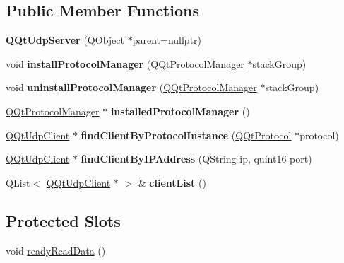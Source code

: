 \subsection*{Public Member Functions}
\begin{DoxyCompactItemize}
\item 
\mbox{\label{class_q_qt_udp_server_a1e105204fe08762d63e36cd4fb41152f}} 
{\bfseries Q\+Qt\+Udp\+Server} (Q\+Object $\ast$parent=nullptr)
\item 
\mbox{\label{class_q_qt_udp_server_aaa8d7be82c3891536fb8c468333db819}} 
void {\bfseries install\+Protocol\+Manager} (\mbox{\hyperlink{class_q_qt_protocol_manager}{Q\+Qt\+Protocol\+Manager}} $\ast$stack\+Group)
\item 
\mbox{\label{class_q_qt_udp_server_a51658b2b05b3f4fda18a01b55f96dd58}} 
void {\bfseries uninstall\+Protocol\+Manager} (\mbox{\hyperlink{class_q_qt_protocol_manager}{Q\+Qt\+Protocol\+Manager}} $\ast$stack\+Group)
\item 
\mbox{\label{class_q_qt_udp_server_a8601ab499f15cb6f327a6ee8944eedb5}} 
\mbox{\hyperlink{class_q_qt_protocol_manager}{Q\+Qt\+Protocol\+Manager}} $\ast$ {\bfseries installed\+Protocol\+Manager} ()
\item 
\mbox{\label{class_q_qt_udp_server_a4ad2108abbe963b75c91cdc175f8ee4f}} 
\mbox{\hyperlink{class_q_qt_udp_client}{Q\+Qt\+Udp\+Client}} $\ast$ {\bfseries find\+Client\+By\+Protocol\+Instance} (\mbox{\hyperlink{class_q_qt_protocol}{Q\+Qt\+Protocol}} $\ast$protocol)
\item 
\mbox{\label{class_q_qt_udp_server_a7b8c8309b94aca216d8f8c9c70f16d3d}} 
\mbox{\hyperlink{class_q_qt_udp_client}{Q\+Qt\+Udp\+Client}} $\ast$ {\bfseries find\+Client\+By\+I\+P\+Address} (Q\+String ip, quint16 port)
\item 
\mbox{\label{class_q_qt_udp_server_ad97b16dc0db309efe379d544c3fb9e8c}} 
Q\+List$<$ \mbox{\hyperlink{class_q_qt_udp_client}{Q\+Qt\+Udp\+Client}} $\ast$ $>$ \& {\bfseries client\+List} ()
\end{DoxyCompactItemize}
\subsection*{Protected Slots}
\begin{DoxyCompactItemize}
\item 
void \mbox{\hyperlink{class_q_qt_udp_server_a1852aa81a63fd5c06e583bde55eaed2e}{ready\+Read\+Data}} ()
\end{DoxyCompactItemize}
